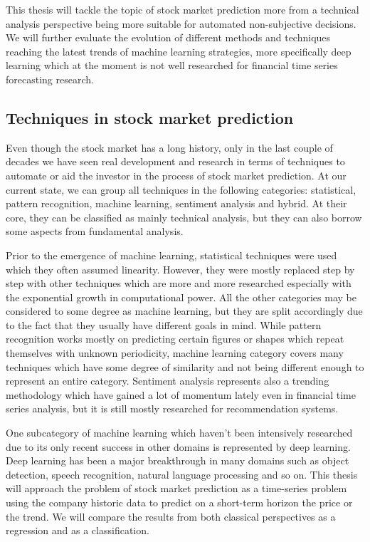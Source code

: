 This thesis will tackle the topic of stock market prediction more from a technical analysis perspective being more suitable for automated non-subjective decisions. We will further evaluate the evolution of different methods and techniques reaching the latest trends of machine learning strategies, more specifically deep learning which at the moment is not well researched for financial time series forecasting research. \cite{sezer2020financial}



\subsection{Techniques in stock market prediction}
Even though the stock market has a long history, only in the last couple of decades we have seen real development and research in terms of techniques to automate or aid the investor in the process of stock market prediction. At our current state, we can group all techniques in the following categories: statistical, pattern recognition, machine learning, sentiment analysis and hybrid.\cite{shah2019stock} At their core, they can be classified as mainly technical analysis, but they can also borrow some aspects from fundamental analysis.

Prior to the emergence of machine learning, statistical techniques were used which they often assumed linearity. However, they were mostly replaced step by step with other techniques which are more and more researched especially with the exponential growth in computational power. All the other categories may be considered to some degree as machine learning, but they are split accordingly due to the fact that they usually have different goals in mind. While pattern recognition works mostly on predicting certain figures or shapes which repeat themselves with unknown periodicity, machine learning category covers many techniques which have some degree of similarity and not being different enough to represent an entire category. Sentiment analysis represents also a trending methodology which have gained a lot of momentum lately even in financial time series analysis, but it is still mostly researched for recommendation systems.

One subcategory of machine learning which haven't been intensively researched due to its only recent success in other domains is represented by deep learning. Deep learning has been a major breakthrough in many domains such as object detection, speech recognition, natural language processing and so on. This thesis will approach the problem of stock market prediction as a time-series problem using the company historic data to predict on a short-term horizon the price or the trend. We will compare the results from both classical perspectives as a regression and as a classification.

